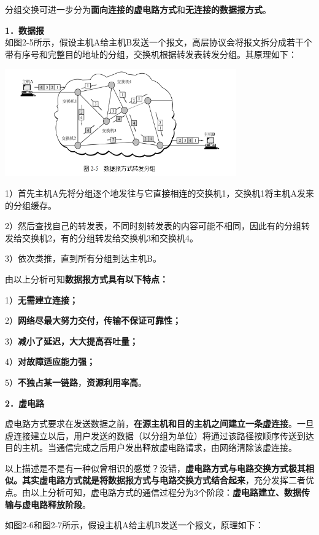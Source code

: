 分组交换可进一步分为\textbf{面向连接的虚电路方式}和\textbf{无连接的数据报方式}。

\textbf{{1．数据报}}\\

如图2-5所示，假设主机A给主机B发送一个报文，高层协议会将报文拆分成若干个带有序号和完整目的地址的分组，交换机根据转发表转发分组。其原理如下：

\includegraphics[width=3.92708in,height=1.81250in]{png-jpeg-pics/C224275A3474E63C00208B6761EED1AD.png}

1）首先主机A先将分组逐个地发往与它直接相连的交换机1，交换机1将主机A发来的分组缓存。

2）然后查找自己的转发表，不同时刻转发表的内容可能不相同，因此有的分组转发给交换机2，有的分组转发给交换机3和交换机4。

3）依次类推，直到所有分组到达主机B。

由以上分析可知\textbf{数据报方式具有以下特点：}

1）\textbf{无需建立连接；}

2）\textbf{网络尽最大努力交付，传输不保证可靠性；}

3）\textbf{减小了延迟，大大提高吞吐量；}

4）\textbf{对故障适应能力强；}

5）\textbf{不独占某一链路}，\textbf{资源利用率高}。

\textbf{{2．虚电路}}

虚电路方式要求在发送数据之前，\textbf{在源主机和目的主机之间建立一条虚连接}。一旦虚连接建立以后，用户发送的数据（以分组为单位）将通过该路径按顺序传送到达目的主机。当通信完成之后用户发出释放虚电路请求，由网络清除该虚连接。

以上描述是不是有一种似曾相识的感觉？没错，\textbf{虚电路方式与电路交换方式极其相似。其实虚电路方式就是将数据报方式与电路交换方式结合起来}，充分发挥二者优点。由以上分析可知，虚电路方式的通信过程分为3个阶段：\textbf{虚电路建立、数据传输与虚电路释放阶段}。

如图2-6和图2-7所示，假设主机A给主机B发送一个报文，原理如下：

